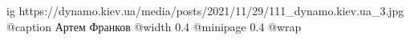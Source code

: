  
 
 
 
 

\ifcmt
  ig https://dynamo.kiev.ua/media/posts/2021/11/29/111_dynamo.kiev.ua_3.jpg
  @caption Артем Франков
  @width 0.4
  @minipage 0.4
  @wrap \parpic[r]
\fi
